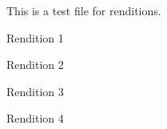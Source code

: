 \documentclass{article}
\begin{document}
This is a test file for renditions.

\begin{rendition1}
Rendition 1
\end{rendition1}

\begin{rendition2}
Rendition 2
\end{rendition2}

\begin{rendition3}
Rendition 3
\end{rendition3}

\begin{rendition4}
Rendition 4
\end{rendition4}
\end{document}
